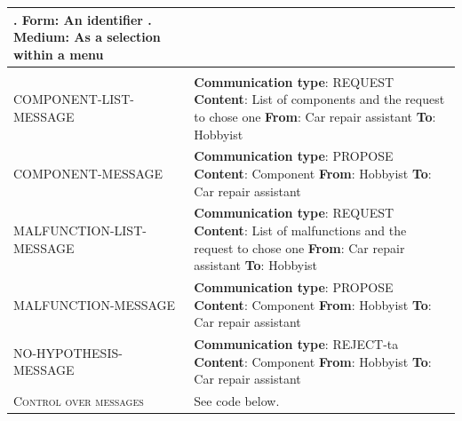 \begin{tabular}{|>{\colleft}p{3cm}|>{\colleft}p{8.5cm}|}
					   2. {\bf Form}: An identifier \newline
					   3. {\bf Medium}: As a selection within a menu\\ \hline
\multicolumn{2}{|l|}{\textsc{Message specifications}}\\ \hline
COMPONENT-LIST-MESSAGE		& {\bf Communication type}: REQUEST\newline
					  {\bf Content}: List of components and the request to chose one\newline
					  {\bf From}: Car repair assistant\newline
					  {\bf To}: Hobbyist\\
COMPONENT-MESSAGE			& {\bf Communication type}: PROPOSE\newline
					  {\bf Content}: Component\newline
					  {\bf From}: Hobbyist\newline
					  {\bf To}: Car repair assistant\\
MALFUNCTION-LIST-MESSAGE	& {\bf Communication type}: REQUEST\newline
					  {\bf Content}: List of malfunctions and the request to chose one\newline
					  {\bf From}: Car repair assistant\newline
					  {\bf To}: Hobbyist\\
MALFUNCTION-MESSAGE		& {\bf Communication type}: PROPOSE\newline
					  {\bf Content}: Component\newline
					  {\bf From}: Hobbyist\newline
					  {\bf To}: Car repair assistant\\
NO-HYPOTHESIS-MESSAGE		& {\bf Communication type}: REJECT-ta\newline
					  {\bf Content}: Component\newline
					  {\bf From}: Hobbyist\newline
					  {\bf To}: Car repair assistant\\\hline
\textsc{Control over messages}& See code below. \\ \hline
\end{tabular}

